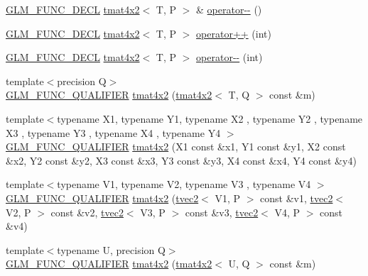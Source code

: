 \begin{DoxyCompactItemize}
\item 
\hyperlink{setup_8hpp_ab2d052de21a70539923e9bcbf6e83a51}{G\+L\+M\+\_\+\+F\+U\+N\+C\+\_\+\+D\+E\+CL} \hyperlink{structglm_1_1detail_1_1tmat4x2}{tmat4x2}$<$ T, P $>$ \& \hyperlink{structglm_1_1detail_1_1tmat4x2_ad648e4a3b4f36d702b584414291734b0}{operator-\/-\/} ()
\item 
\hyperlink{setup_8hpp_ab2d052de21a70539923e9bcbf6e83a51}{G\+L\+M\+\_\+\+F\+U\+N\+C\+\_\+\+D\+E\+CL} \hyperlink{structglm_1_1detail_1_1tmat4x2}{tmat4x2}$<$ T, P $>$ \hyperlink{structglm_1_1detail_1_1tmat4x2_a1fe0b314b257ad441100c5d3686e4884}{operator++} (int)
\item 
\hyperlink{setup_8hpp_ab2d052de21a70539923e9bcbf6e83a51}{G\+L\+M\+\_\+\+F\+U\+N\+C\+\_\+\+D\+E\+CL} \hyperlink{structglm_1_1detail_1_1tmat4x2}{tmat4x2}$<$ T, P $>$ \hyperlink{structglm_1_1detail_1_1tmat4x2_a585f40b5e70d68bab7efa8a6e302e8d8}{operator-\/-\/} (int)
\item 
{\footnotesize template$<$precision Q$>$ }\\\hyperlink{setup_8hpp_a33fdea6f91c5f834105f7415e2a64407}{G\+L\+M\+\_\+\+F\+U\+N\+C\+\_\+\+Q\+U\+A\+L\+I\+F\+I\+ER} \hyperlink{structglm_1_1detail_1_1tmat4x2_adbb722f9fddaebd63f497f46b75d004b}{tmat4x2} (\hyperlink{structglm_1_1detail_1_1tmat4x2}{tmat4x2}$<$ T, Q $>$ const \&m)
\item 
{\footnotesize template$<$typename X1, typename Y1, typename X2 , typename Y2 , typename X3 , typename Y3 , typename X4 , typename Y4 $>$ }\\\hyperlink{setup_8hpp_a33fdea6f91c5f834105f7415e2a64407}{G\+L\+M\+\_\+\+F\+U\+N\+C\+\_\+\+Q\+U\+A\+L\+I\+F\+I\+ER} \hyperlink{structglm_1_1detail_1_1tmat4x2_a0c0478eabc7a5766b287d58338d16ea2}{tmat4x2} (X1 const \&x1, Y1 const \&y1, X2 const \&x2, Y2 const \&y2, X3 const \&x3, Y3 const \&y3, X4 const \&x4, Y4 const \&y4)
\item 
{\footnotesize template$<$typename V1, typename V2, typename V3 , typename V4 $>$ }\\\hyperlink{setup_8hpp_a33fdea6f91c5f834105f7415e2a64407}{G\+L\+M\+\_\+\+F\+U\+N\+C\+\_\+\+Q\+U\+A\+L\+I\+F\+I\+ER} \hyperlink{structglm_1_1detail_1_1tmat4x2_a0d9b0f653d1eb4999d09d71bc0e455f7}{tmat4x2} (\hyperlink{structglm_1_1detail_1_1tvec2}{tvec2}$<$ V1, P $>$ const \&v1, \hyperlink{structglm_1_1detail_1_1tvec2}{tvec2}$<$ V2, P $>$ const \&v2, \hyperlink{structglm_1_1detail_1_1tvec2}{tvec2}$<$ V3, P $>$ const \&v3, \hyperlink{structglm_1_1detail_1_1tvec2}{tvec2}$<$ V4, P $>$ const \&v4)
\item 
{\footnotesize template$<$typename U, precision Q$>$ }\\\hyperlink{setup_8hpp_a33fdea6f91c5f834105f7415e2a64407}{G\+L\+M\+\_\+\+F\+U\+N\+C\+\_\+\+Q\+U\+A\+L\+I\+F\+I\+ER} \hyperlink{structglm_1_1detail_1_1tmat4x2_a81ca48dabefc74d85c49880c33f0f6e5}{tmat4x2} (\hyperlink{structglm_1_1detail_1_1tmat4x2}{tmat4x2}$<$ U, Q $>$ const \&m)

\end{DoxyCompactItemize}
